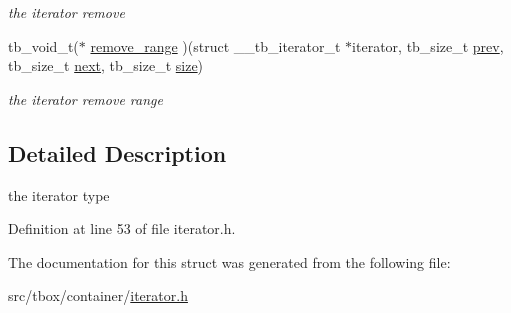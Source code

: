 \begin{DoxyCompactItemize}
\begin{DoxyCompactList}\small\item\em the iterator remove \end{DoxyCompactList}\item 
\hypertarget{structtb__iterator__t_a8d49a2f8633aadf9a21bada72f2371e0}{tb\-\_\-void\-\_\-t($\ast$ \hyperlink{structtb__iterator__t_a8d49a2f8633aadf9a21bada72f2371e0}{remove\-\_\-range} )(struct \-\_\-\-\_\-tb\-\_\-iterator\-\_\-t $\ast$iterator, tb\-\_\-size\-\_\-t \hyperlink{structtb__iterator__t_a9071355443d00b1a4e3074a369459424}{prev}, tb\-\_\-size\-\_\-t \hyperlink{structtb__iterator__t_ac7840be6d4d222c4f11c9a6089a1dc81}{next}, tb\-\_\-size\-\_\-t \hyperlink{structtb__iterator__t_a207eb4f4199b1f771ed07fd03f341934}{size})}\label{structtb__iterator__t_a8d49a2f8633aadf9a21bada72f2371e0}

\begin{DoxyCompactList}\small\item\em the iterator remove range \end{DoxyCompactList}\end{DoxyCompactItemize}


\subsection{Detailed Description}
the iterator type 

Definition at line 53 of file iterator.\-h.



The documentation for this struct was generated from the following file\-:\begin{DoxyCompactItemize}
\item 
src/tbox/container/\hyperlink{iterator_8h}{iterator.\-h}\end{DoxyCompactItemize}
